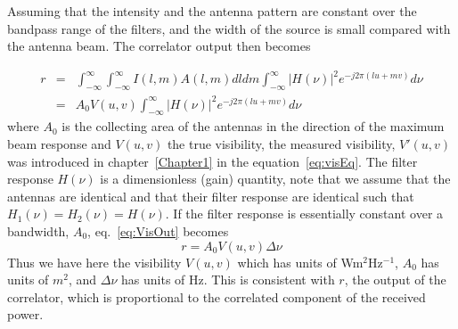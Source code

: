 Assuming that the intensity and the antenna pattern are constant over the bandpass range of the filters, and the width of the source is small compared with the antenna beam. The correlator output then becomes 

\begin{eqnarray}
\label{eq:VisOut0}
r&=&\int^{\infty}_{-\infty}\int^{\infty}_{-\infty}{I(l,m)A(l,m)}dldm\int^{\infty}_{-\infty}{|H(\nu)|^2}e^{-j2\pi(lu + mv)}d\nu \\
&=& A_0{V(u,v)}\int^{\infty}_{-\infty}{|H(\nu)|^2}e^{-j2\pi(lu + mv)}d\nu  \label{eq:VisOut} 
\end{eqnarray}
where $A_0$ is the collecting area of the antennas in the direction of the maximum beam response and $V(u,v)$ the true visibility, the measured visibility, $V'(u,v)$ was introduced in chapter~\ref{Chapter1} in the equation~\ref{eq:visEq}. The filter response $H(\nu)$ is a dimensionless (gain) quantity, note that we assume that the antennas are identical and that their filter response are identical such that $H_1(\nu)=H_2(\nu)=H(\nu)$. If the filter response is essentially constant over a bandwidth, $A_0$, eq.~\ref{eq:VisOut} becomes
\begin{equation}
 r = A_0{V(u, v)}\Delta{\nu} 
\end{equation}
Thus we have here the visibility $V(u, v)$ which has units of Wm$^2$Hz$^{-1}$, $A_0$ has units of $m^2$, and $\Delta{\nu}$ has units of Hz. This is consistent with $r$, the output of the correlator, which is proportional to the correlated component of the received power. 
